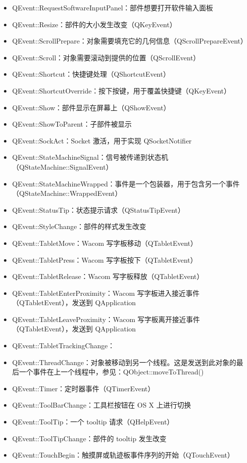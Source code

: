 \begin{itemize}
\item{QEvent::RequestSoftwareInputPanel：部件想要打开软件输入面板}
\item{QEvent::Resize：部件的大小发生改变（QKeyEvent）}
\item{QEvent::ScrollPrepare：对象需要填充它的几何信息（QScrollPrepareEvent）}
\item{QEvent::Scroll：对象需要滚动到提供的位置（QScrollEvent）}
\item{QEvent::Shortcut：快捷键处理（QShortcutEvent）}
\item{QEvent::ShortcutOverride：按下按键，用于覆盖快捷键（QKeyEvent）}
\item{QEvent::Show：部件显示在屏幕上（QShowEvent）}
\item{QEvent::ShowToParent：子部件被显示}
\item{QEvent::SockAct：Socket 激活，用于实现 QSocketNotifier}
\item{QEvent::StateMachineSignal：信号被传递到状态机（QStateMachine::SignalEvent）}
\item{QEvent::StateMachineWrapped：事件是一个包装器，用于包含另一个事件（QStateMachine::WrappedEvent）}
\item{QEvent::StatusTip：状态提示请求（QStatusTipEvent）}
\item{QEvent::StyleChange：部件的样式发生改变}
\item{QEvent::TabletMove：Wacom 写字板移动（QTabletEvent）}
\item{QEvent::TabletPress：Wacom 写字板按下（QTabletEvent）}
\item{QEvent::TabletRelease：Wacom 写字板释放（QTabletEvent）}
\item{QEvent::TabletEnterProximity：Wacom 写字板进入接近事件（QTabletEvent），发送到 QApplication}
\item{QEvent::TabletLeaveProximity：Wacom 写字板离开接近事件（QTabletEvent），发送到 QApplication}
\item{QEvent::TabletTrackingChange：}
\item{QEvent::ThreadChange：对象被移动到另一个线程。这是发送到此对象的最后一个事件在上一个线程中，参见：QObject::moveToThread()}
\item{QEvent::Timer：定时器事件（QTimerEvent）}
\item{QEvent::ToolBarChange：工具栏按钮在 OS X 上进行切换}
\item{QEvent::ToolTip：一个 tooltip 请求（QHelpEvent）}
\item{QEvent::ToolTipChange：部件的 tooltip 发生改变}
\item{QEvent::TouchBegin：触摸屏或轨迹板事件序列的开始（QTouchEvent）}

\end{itemize}
